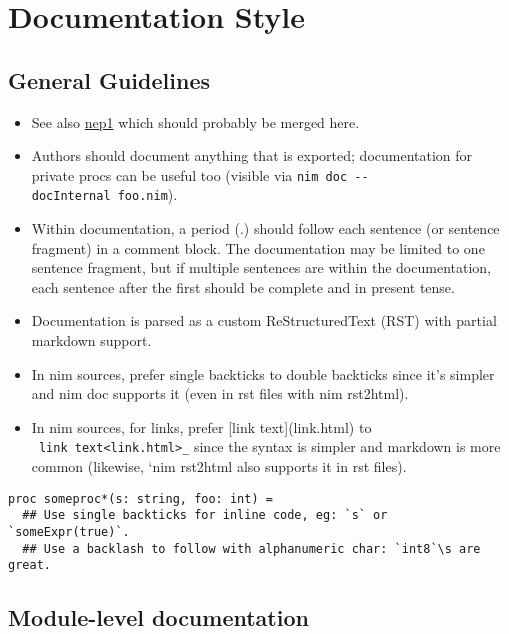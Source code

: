 \hypertarget{documentation-style}{%
\section{Documentation Style}\label{documentation-style}}

\hypertarget{general-guidelines}{%
\subsection{General Guidelines}\label{general-guidelines}}

\begin{itemize}
\tightlist
\item
  See also \href{https://nim-lang.github.io/Nim/nep1.html}{nep1} which
  should probably be merged here.
\item
  Authors should document anything that is exported; documentation for
  private procs can be useful too (visible via
  \texttt{nim\ doc\ -\/-docInternal\ foo.nim}).
\item
  Within documentation, a period ({.}) should follow each sentence (or
  sentence fragment) in a comment block. The documentation may be
  limited to one sentence fragment, but if multiple sentences are within
  the documentation, each sentence after the first should be complete
  and in present tense.
\item
  Documentation is parsed as a custom ReStructuredText (RST) with
  partial markdown support.
\item
  In nim sources, prefer single backticks to double backticks since it's
  simpler and {nim doc} supports it (even in rst files with {nim
  rst2html}).
\item
  In nim sources, for links, prefer {{[}link text{]}(link.html)} to
  \texttt{\textasciigrave{}\ \textasciigrave{}link\ text\textless{}link.html\textgreater{}\textasciigrave{}\_}{
  since the syntax is simpler and markdown is more common (likewise,
  `nim rst2html} also supports it in rst files).
\end{itemize}

\begin{verbatim}
proc someproc*(s: string, foo: int) =
  ## Use single backticks for inline code, eg: `s` or `someExpr(true)`.
  ## Use a backlash to follow with alphanumeric char: `int8`\s are great.
\end{verbatim}

\hypertarget{module-level-documentation}{%
\subsection{Module-level
documentation}\label{module-level-documentation}}

